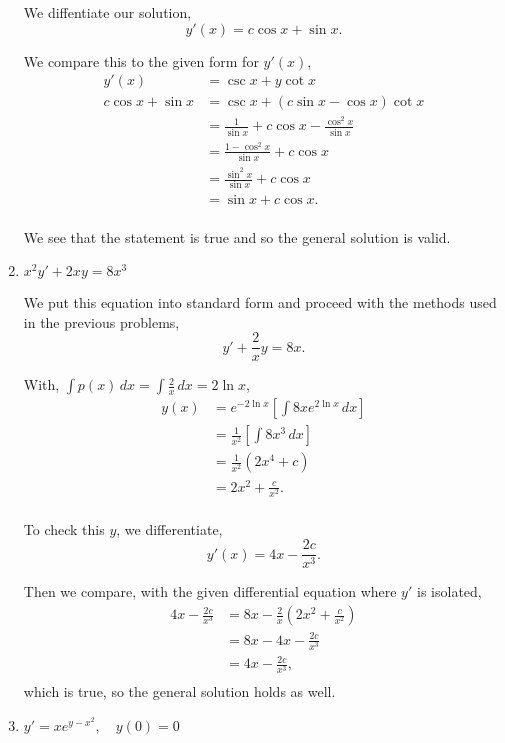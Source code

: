 \documentclass[../hw5]{subfiles}
\begin{document}
\begin{enumerate}[label= (\alph*)]
    We diffentiate our solution,
    \[y'(x)=c\cos{x}+\sin{x}.\]

    We compare this to the given form for $y'(x)$,
    \begin{align*}
        y'(x)&=\csc{x}+y\cot{x}\\
        c\cos{x}+\sin{x}&=\csc{x}+(c\sin{x}-\cos{x})\cot{x}\\
        &=\frac{1}{\sin{x}}+c\cos{x}-\frac{\cos^2{x}}{\sin{x}}\\
        &=\frac{1-\cos^2{x}}{\sin{x}}+c\cos{x}\\
        &=\frac{\sin^2{x}}{\sin{x}}+c\cos{x} \\
        &=\sin{x}+c\cos{x}. \\
    \end{align*}

    We see that the statement is true and so the general solution is valid.

    \item $x^2y'+2xy=8x^3$
    
    We put this equation into standard form and proceed with the methods used in the previous problems,
    \[y'+\frac{2}{x}y=8x.\]

    With, $\int p(x)\,dx=\int\frac{2}{x}\,dx=2\ln{x}$,
    \begin{align*}
        y(x)&=e^{-2\ln{x}}\left[ \int 8xe^{2\ln{x}}\,dx \right] \\
        &=\frac{1}{x^2}\left[ \int 8x^3\,dx \right] \\
        &=\frac{1}{x^2}\left( 2x^4+c \right) \\
        &=2x^2+\frac{c}{x^2}. \\
    \end{align*}

    To check this $y$, we differentiate,
    \[y'(x)=4x-\frac{2c}{x^3}.\]

    Then we compare, with the given differential equation where $y'$ is isolated,
    \begin{align*}
        4x-\frac{2c}{x^3}&=8x-\frac{2}{x}\left( 2x^2+\frac{c}{x^2} \right) \\
        &=8x-4x-\frac{2c}{x^3} \\
        &=4x-\frac{2c}{x^3}, \\
    \end{align*}
    which is true, so the general solution holds as well.

    \item $y'=xe^{y-x^2}, \quad y(0)=0$
    

\end{enumerate}
\end{document}
